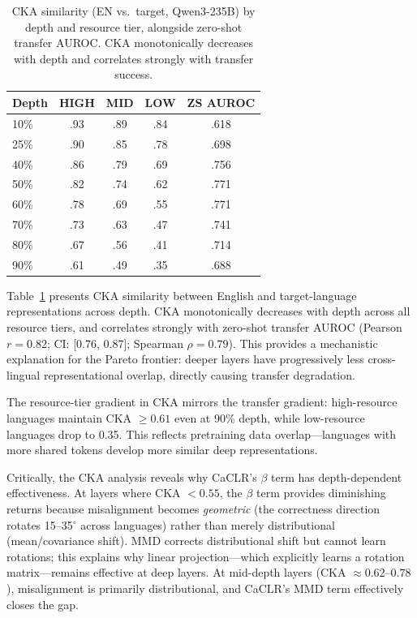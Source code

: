 \documentclass[11pt,a4paper]{article}
\begin{document}
\begin{table}[t]
\centering
\small
\begin{tabular}{@{}lcccc@{}}
\toprule
\textbf{Depth} & \textbf{HIGH} & \textbf{MID} & \textbf{LOW} & \textbf{ZS AUROC} \\
\midrule
10\% & .93 & .89 & .84 & .618 \\
25\% & .90 & .85 & .78 & .698 \\
40\% & .86 & .79 & .69 & .756 \\
50\% & .82 & .74 & .62 & .771 \\
60\% & .78 & .69 & .55 & .771 \\
70\% & .73 & .63 & .47 & .741 \\
80\% & .67 & .56 & .41 & .714 \\
90\% & .61 & .49 & .35 & .688 \\
\bottomrule
\end{tabular}
\caption{CKA similarity (EN vs.\ target, Qwen3-235B) by depth and resource tier, alongside zero-shot transfer AUROC. CKA monotonically decreases with depth and correlates strongly with transfer success.}
\label{tab:cka}
\end{table}

Table~\ref{tab:cka} presents CKA similarity between English and target-language representations across depth.
CKA monotonically decreases with depth across all resource tiers, and correlates strongly with zero-shot transfer AUROC (Pearson $r = 0.82$; CI: [0.76, 0.87]; Spearman $\rho = 0.79$).
This provides a mechanistic explanation for the Pareto frontier: deeper layers have progressively less cross-lingual representational overlap, directly causing transfer degradation.

The resource-tier gradient in CKA mirrors the transfer gradient: high-resource languages maintain CKA $\geq 0.61$ even at 90\% depth, while low-resource languages drop to 0.35.
This reflects pretraining data overlap---languages with more shared tokens develop more similar deep representations.

Critically, the CKA analysis reveals why CaCLR's $\beta$ term has depth-dependent effectiveness.
At layers where CKA $< 0.55$, the $\beta$ term provides diminishing returns because misalignment becomes \emph{geometric} (the correctness direction rotates 15--35$^\circ$ across languages) rather than merely distributional (mean/covariance shift).
MMD corrects distributional shift but cannot learn rotations; this explains why linear projection---which explicitly learns a rotation matrix---remains effective at deep layers.
At mid-depth layers (CKA $\approx 0.62$--$0.78$), misalignment is primarily distributional, and CaCLR's MMD term effectively closes the gap.
\end{document}
